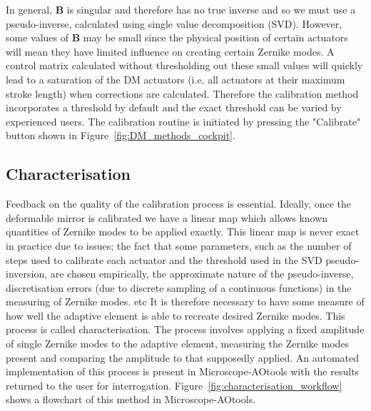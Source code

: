In general, $\boldsymbol{B}$ is singular and therefore has no true inverse and so we must use a pseudo-inverse, calculated using single value decomposition (SVD). However, some values of $\boldsymbol{B}$ may be small since the physical position of certain actuators will mean they have limited influence on creating certain Zernike modes. A control matrix calculated without thresholding out these small values will quickly lead to a saturation of the DM actuators (i.e. all actuators at their maximum stroke length) when corrections are calculated.\cite{booth2005methods} Therefore the calibration method incorporates a threshold by default and the exact threshold can be varied by experienced users. The calibration routine is initiated by pressing the "Calibrate" button shown in Figure~\ref{fig:DM_methods_cockpit}.

\subsection{Characterisation}
\label{subsec:characterisation}

Feedback on the quality of the calibration process is essential. Ideally, once the deformable mirror is calibrated we have a linear map which allows known quantities of Zernike modes to be applied exactly. This linear map is never exact in practice due to issues; the fact that some parameters, such as the number of steps used to calibrate each actuator and the threshold used in the SVD pseudo-inversion, are chosen empirically, the approximate nature of the pseudo-inverse, discretisation errors (due to discrete sampling of a continuous functions) in the measuring of Zernike modes. etc It is therefore necessary to have some measure of how well the adaptive element is able to recreate desired Zernike modes. This process is called characterisation. The process involves applying a fixed amplitude of single Zernike modes to the adaptive element, measuring the Zernike modes present and comparing the amplitude to that supposedly applied. An automated implementation of this process is present in Microscope-AOtools with the results returned to the user for interrogation. Figure~\ref{fig:characterisation_workflow} shows a flowchart of this method in Microscope-AOtools. 

